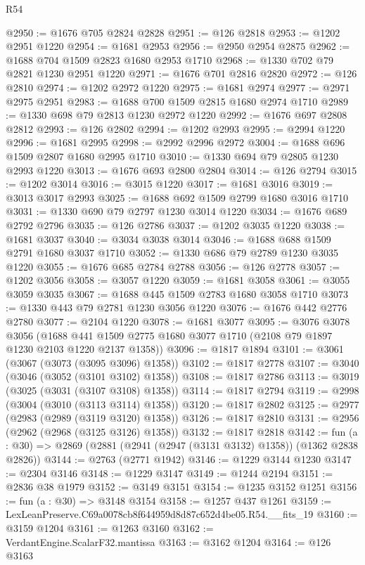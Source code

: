 \begin{lexlean}{R54}
\begin{coremodule}
@2950 := @1676 @705 @2824 @2828
@2951 := @126 @2818
@2953 := @1202 @2951 @1220
@2954 := @1681 @2953
@2956 := @2950 @2954 @2875
@2962 := @1688 @704 @1509 @2823 @1680 @2953 @1710
@2968 := @1330 @702 @79 @2821 @1230 @2951 @1220
@2971 := @1676 @701 @2816 @2820
@2972 := @126 @2810
@2974 := @1202 @2972 @1220
@2975 := @1681 @2974
@2977 := @2971 @2975 @2951
@2983 := @1688 @700 @1509 @2815 @1680 @2974 @1710
@2989 := @1330 @698 @79 @2813 @1230 @2972 @1220
@2992 := @1676 @697 @2808 @2812
@2993 := @126 @2802
@2994 := @1202 @2993
@2995 := @2994 @1220
@2996 := @1681 @2995
@2998 := @2992 @2996 @2972
@3004 := @1688 @696 @1509 @2807 @1680 @2995 @1710
@3010 := @1330 @694 @79 @2805 @1230 @2993 @1220
@3013 := @1676 @693 @2800 @2804
@3014 := @126 @2794
@3015 := @1202 @3014
@3016 := @3015 @1220
@3017 := @1681 @3016
@3019 := @3013 @3017 @2993
@3025 := @1688 @692 @1509 @2799 @1680 @3016 @1710
@3031 := @1330 @690 @79 @2797 @1230 @3014 @1220
@3034 := @1676 @689 @2792 @2796
@3035 := @126 @2786
@3037 := @1202 @3035 @1220
@3038 := @1681 @3037
@3040 := @3034 @3038 @3014
@3046 := @1688 @688 @1509 @2791 @1680 @3037 @1710
@3052 := @1330 @686 @79 @2789 @1230 @3035 @1220
@3055 := @1676 @685 @2784 @2788
@3056 := @126 @2778
@3057 := @1202 @3056
@3058 := @3057 @1220
@3059 := @1681 @3058
@3061 := @3055 @3059 @3035
@3067 := @1688 @445 @1509 @2783 @1680 @3058 @1710
@3073 := @1330 @443 @79 @2781 @1230 @3056 @1220
@3076 := @1676 @442 @2776 @2780
@3077 := @2104 @1220
@3078 := @1681 @3077
@3095 := @3076
    @3078
    @3056
    (@1688 @441 @1509 @2775 @1680 @3077 @1710 (@2108 @79 @1897 @1230 @2103 @1220 @2137 @1358))
@3096 := @1817 @1894
@3101 := @3061 (@3067 (@3073 (@3095 @3096) @1358))
@3102 := @1817 @2778
@3107 := @3040 (@3046 (@3052 (@3101 @3102) @1358))
@3108 := @1817 @2786
@3113 := @3019 (@3025 (@3031 (@3107 @3108) @1358))
@3114 := @1817 @2794
@3119 := @2998 (@3004 (@3010 (@3113 @3114) @1358))
@3120 := @1817 @2802
@3125 := @2977 (@2983 (@2989 (@3119 @3120) @1358))
@3126 := @1817 @2810
@3131 := @2956 (@2962 (@2968 (@3125 @3126) @1358))
@3132 := @1817 @2818
@3142 := fun (a : @30) => @2869 (@2881 (@2941 (@2947 (@3131 @3132) @1358)) (@1362 @2838 @2826))
@3144 := @2763 (@2771 @1942)
@3146 := @1229 @3144 @1230
@3147 := @2304 @3146
@3148 := @1229 @3147
@3149 := @1244 @2194
@3151 := @2836 @38 @1979
@3152 := @3149 @3151
@3154 := @1235 @3152 @1251
@3156 := fun (a : @30) => @3148 @3154
@3158 := @1257 @437 @1261
@3159 := LexLeanPreserve.C69a0078cb8f644959d8d87c652d4be05.R54.__fits_19
@3160 := @3159 @1204
@3161 := @1263 @3160
@3162 := VerdantEngine.ScalarF32.mantissa
@3163 := @3162 @1204
@3164 := @126 @3163

\end{coremodule}
\end{lexlean}
